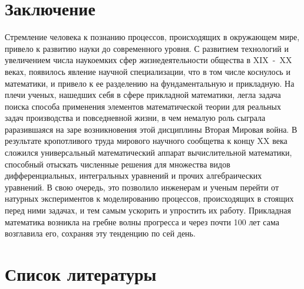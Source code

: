 \section{Заключение}
Стремление человека к познанию процессов, происходящих в окружающем мире, привело к развитию науки до современного уровня. С развитием технологий и увеличением числа наукоемких сфер жизнедеятельности общества в XIX~-~XX веках, появилось явление научной специализации, что в том числе коснулось и математики, и привело к ее разделению на фундаментальную и прикладную. На плечи ученых, нашедших себя в сфере прикладной математики, легла задача поиска способа применения элементов математической теории для реальных задач производства и повседневной жизни, в чем немалую роль сыграла раразившаяся на заре возникновения этой дисциплины Вторая Мировая война. В результате кропотливого труда мирового научного сообщетва к концу XX века сложился универсальный математический аппарат вычислительной математики, способный отыскать численные решения для множества видов дифференциальных, интегральных уравнений и прочих алгебраических уравнений. В свою очередь, это позволило инженерам и ученым перейти от натурных экспериментов к моделированию процессов, происходящих в стоящих перед ними задачах, и тем самым ускорить и упростить их работу. Прикладная математика возникла на гребне волны прогресса и через почти 100 лет сама возглавила его, сохраняя эту тенденцию по сей день.


\nocite{*}
\section*{Список литературы}
\printbibliography[heading=none]
